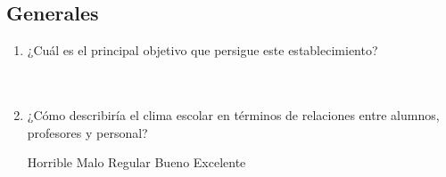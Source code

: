 \documentclass{article}
\begin{document}
\newpage
\subsection*{Generales}
\begin{enumerate}[leftmargin=*, label=\arabic*.]
    \item ¿Cuál es el principal objetivo que persigue este establecimiento?\\[0.5cm]
        \underline{\hspace{0.95\linewidth}} \vspace{0.3cm} \\
        \underline{\hspace{0.95\linewidth}} \vspace{0.3cm} \\
        \underline{\hspace{0.95\linewidth}} \vspace{0.3cm}
    \item ¿Cómo describiría el clima escolar en términos de relaciones entre alumnos, profesores y personal? %
    \begin{center}
        Horrible \hspace{0.7cm} Malo \hspace{0.7cm} Regular \hspace{0.7cm} Bueno \hspace{0.7cm} Excelente
    \end{center}
        \underline{\hspace{0.95\linewidth}} \vspace{0.3cm} \\
        \underline{\hspace{0.95\linewidth}} \vspace{0.3cm} \\
        \underline{\hspace{0.95\linewidth}} \vspace{0.3cm}

\end{enumerate}
\end{document}

